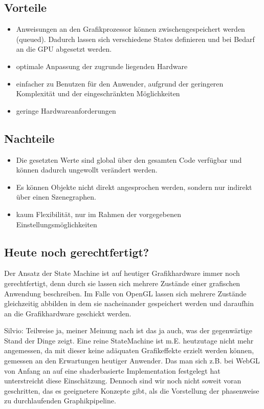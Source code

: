 \documentclass[12pt]{scrreprt}
\begin{document}
\subsection*{Vorteile}

\begin{itemize}
  \item Anweisungen an den Grafikprozessor können zwischengespeichert werden
  (queued). Dadurch lassen sich verschiedene States definieren und bei Bedarf an
  die GPU abgesetzt werden.
  \item optimale Anpassung der zugrunde liegenden Hardware
  \item einfacher zu Benutzen für den Anwender, aufgrund der
    geringeren Komplexität und der eingeschränkten Möglichkeiten
  \item geringe Hardwareanforderungen
\end{itemize}

\subsection*{Nachteile}

\begin{itemize}
  \item Die gesetzten Werte sind global über den gesamten Code verfügbar und
  können dadurch ungewollt verändert werden.
  \item Es können Objekte nicht direkt angesprochen werden, sondern nur indirekt
  über einen Szenegraphen.
  \item kaum Flexibilität, nur im Rahmen der vorgegebenen
    Einstellungsmöglichkeiten
\end{itemize}

\subsection*{Heute noch gerechtfertigt?}

Der Ansatz der State Machine ist auf heutiger Grafikhardware immer noch
gerechtfertigt, denn durch sie lassen sich mehrere Zustände einer grafischen
Anwendung beschreiben.  Im Falle von OpenGL lassen sich mehrere Zustände
gleichzeitig abbilden in dem sie nacheinander gespeichert werden und daraufhin
an die Grafikhardware geschickt werden.

Silvio: Teilweise ja, meiner Meinung nach ist das ja auch, was der
gegenwärtige Stand der Dinge zeigt. Eine reine StateMachine ist m.E.
heutzutage nicht mehr angemessen, da mit dieser keine adäquaten
Grafikeffekte erzielt werden können, gemessen an den Erwartungen
heutiger Anwender. Das man sich z.B. bei WebGL von Anfang an auf eine
shaderbasierte Implementation festgelegt hat unterstreicht diese
Einschätzung.
Dennoch sind wir noch nicht soweit voran geschritten, das es
geeignetere Konzepte gibt, als die Vorstellung der phasenweise zu
durchlaufenden Graphikpipeline.
\end{document}
